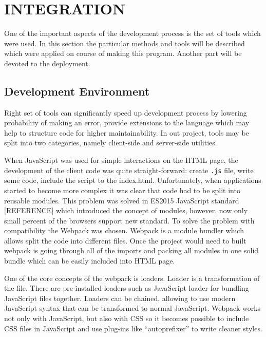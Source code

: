 \section{INTEGRATION}



One of the important aspects of the development process is the set of tools which were
used. In this section the particular methods and tools will be described which
were applied on course of making this program. Another part will be devoted to
the deployment.

\subsection{Development Environment}

Right set of tools can significantly speed up development process by lowering probability of making
an error, provide extensions to the language which may help to structure code for higher
maintainability. In out project, tools may be split into two categories, namely client-side and
server-side utilities.

When JavaScript was used for simple interactions on the HTML page, the development of the client
code was quite straight-forward: create \texttt{.js} file, write some code, include the script to
the index.html. Unfortunately, when applications started to become more complex it was clear that
code had to be split into reusable modules. This problem was solved in ES2015 JavaScript standard
[REFERENCE] which introduced the concept of modules, however, now only small percent of the browsers
support new standard. To solve the problem with compatibility the Webpack was chosen. Webpack is a
module bundler which allows split the code into different files. Once the project would need to
built webpack is going through all of the imports and packing all modules in one solid bundle which
can be easily included into HTML page.

One of the core concepts of the webpack is loaders. Loader is a transformation
of the file. There are pre-installed loaders such as JavaScript loader for
bundling JavaScript files together. Loaders can be chained, allowing to use modern
JavaScript syntax that can be transformed to normal JavaScript. Webpack
works not only with JavaScript, but also with CSS so it becomes possible to include
CSS files in JavaScript and use plug-ins like ``autoprefixer'' to write cleaner styles.

